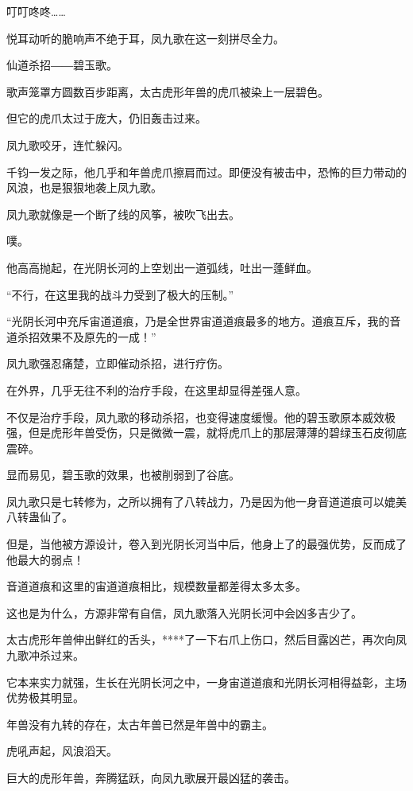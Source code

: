
\begin{this_body}

叮叮咚咚……

悦耳动听的脆响声不绝于耳，凤九歌在这一刻拼尽全力。

仙道杀招――碧玉歌。

歌声笼罩方圆数百步距离，太古虎形年兽的虎爪被染上一层碧色。

但它的虎爪太过于庞大，仍旧轰击过来。

凤九歌咬牙，连忙躲闪。

千钧一发之际，他几乎和年兽虎爪擦肩而过。即便没有被击中，恐怖的巨力带动的风浪，也是狠狠地袭上凤九歌。

凤九歌就像是一个断了线的风筝，被吹飞出去。

噗。

他高高抛起，在光阴长河的上空划出一道弧线，吐出一蓬鲜血。

“不行，在这里我的战斗力受到了极大的压制。”

“光阴长河中充斥宙道道痕，乃是全世界宙道道痕最多的地方。道痕互斥，我的音道杀招效果不及原先的一成！”

凤九歌强忍痛楚，立即催动杀招，进行疗伤。

在外界，几乎无往不利的治疗手段，在这里却显得差强人意。

不仅是治疗手段，凤九歌的移动杀招，也变得速度缓慢。他的碧玉歌原本威效极强，但是虎形年兽受伤，只是微微一震，就将虎爪上的那层薄薄的碧绿玉石皮彻底震碎。

显而易见，碧玉歌的效果，也被削弱到了谷底。

凤九歌只是七转修为，之所以拥有了八转战力，乃是因为他一身音道道痕可以媲美八转蛊仙了。

但是，当他被方源设计，卷入到光阴长河当中后，他身上了的最强优势，反而成了他最大的弱点！

音道道痕和这里的宙道道痕相比，规模数量都差得太多太多。

这也是为什么，方源非常有自信，凤九歌落入光阴长河中会凶多吉少了。

太古虎形年兽伸出鲜红的舌头，****了一下右爪上伤口，然后目露凶芒，再次向凤九歌冲杀过来。

它本来实力就强，生长在光阴长河之中，一身宙道道痕和光阴长河相得益彰，主场优势极其明显。

年兽没有九转的存在，太古年兽已然是年兽中的霸主。

虎吼声起，风浪滔天。

巨大的虎形年兽，奔腾猛跃，向凤九歌展开最凶猛的袭击。


\end{this_body}
